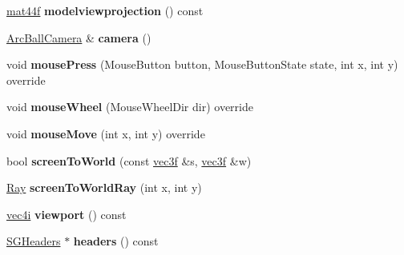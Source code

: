 \begin{DoxyCompactItemize}
\item 
\hypertarget{classps_1_1scene_1_1SGEngine_a503bcd135409aaeb34e81ae86989760b}{}\hyperlink{classps_1_1base_1_1Matrix}{mat44f} {\bfseries modelviewprojection} () const \label{classps_1_1scene_1_1SGEngine_a503bcd135409aaeb34e81ae86989760b}

\item 
\hypertarget{classps_1_1scene_1_1SGEngine_a4c75fdaec36509fb7514ce525fe51839}{}\hyperlink{classps_1_1scene_1_1ArcBallCamera}{Arc\+Ball\+Camera} \& {\bfseries camera} ()\label{classps_1_1scene_1_1SGEngine_a4c75fdaec36509fb7514ce525fe51839}

\item 
\hypertarget{classps_1_1scene_1_1SGEngine_a42d0aedf8ea474767800604c56461dd7}{}void {\bfseries mouse\+Press} (Mouse\+Button button, Mouse\+Button\+State state, int x, int y) override\label{classps_1_1scene_1_1SGEngine_a42d0aedf8ea474767800604c56461dd7}

\item 
\hypertarget{classps_1_1scene_1_1SGEngine_abfe59ca1d941e7e6d73af345169c74a5}{}void {\bfseries mouse\+Wheel} (Mouse\+Wheel\+Dir dir) override\label{classps_1_1scene_1_1SGEngine_abfe59ca1d941e7e6d73af345169c74a5}

\item 
\hypertarget{classps_1_1scene_1_1SGEngine_a0f9ab0012b7905f76d1e4a60e82524f6}{}void {\bfseries mouse\+Move} (int x, int y) override\label{classps_1_1scene_1_1SGEngine_a0f9ab0012b7905f76d1e4a60e82524f6}

\item 
\hypertarget{classps_1_1scene_1_1SGEngine_a75a0dacdcd15a90a0caa866e05999bf5}{}bool {\bfseries screen\+To\+World} (const \hyperlink{classps_1_1base_1_1Vec3}{vec3f} \&s, \hyperlink{classps_1_1base_1_1Vec3}{vec3f} \&w)\label{classps_1_1scene_1_1SGEngine_a75a0dacdcd15a90a0caa866e05999bf5}

\item 
\hypertarget{classps_1_1scene_1_1SGEngine_afbf3f9b67283bd90f1d087b1858ffdc8}{}\hyperlink{classps_1_1base_1_1Ray}{Ray} {\bfseries screen\+To\+World\+Ray} (int x, int y)\label{classps_1_1scene_1_1SGEngine_afbf3f9b67283bd90f1d087b1858ffdc8}

\item 
\hypertarget{classps_1_1scene_1_1SGEngine_a9b2ae67ded1e41e090557a317f917d87}{}\hyperlink{classps_1_1base_1_1Vec4}{vec4i} {\bfseries viewport} () const \label{classps_1_1scene_1_1SGEngine_a9b2ae67ded1e41e090557a317f917d87}

\item 
\hypertarget{classps_1_1scene_1_1SGEngine_af2bd2d9c29925ddbfce7b390b126d6e2}{}\hyperlink{classps_1_1scene_1_1SGHeaders}{S\+G\+Headers} $\ast$ {\bfseries headers} () const \label{classps_1_1scene_1_1SGEngine_af2bd2d9c29925ddbfce7b390b126d6e2}


\end{DoxyCompactItemize}
